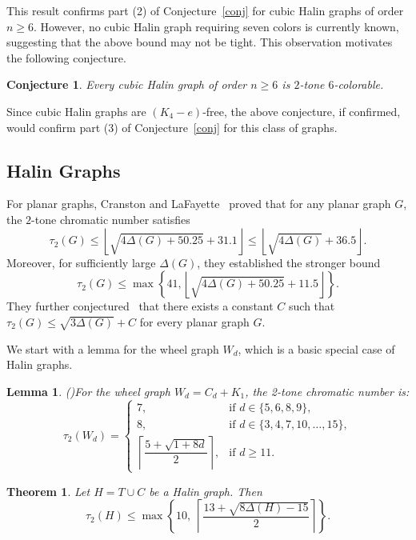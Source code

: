 \documentclass[12pt]{article}
\newtheorem{theorem}{Theorem}
\numberwithin{theorem}{section}
\newtheorem{conjecture}{Conjecture}
\numberwithin{conjecture}{section}
\numberwithin{corollary}{section}
\numberwithin{example}{section}
\newtheorem{lemma}{Lemma}
\numberwithin{lemma}{section}
\numberwithin{proposition}{section}
\numberwithin{problem}{section}
\numberwithin{remark}{section}
\numberwithin{claim}{theorem}
\numberwithin{definition}{section}
\begin{document}
\noindent This result confirms part (2) of Conjecture~\ref{conj} for cubic Halin graphs of order $n \ge 6$. However, no cubic Halin graph requiring seven colors is currently known, suggesting that the above bound may not be tight. This observation motivates the following conjecture.

\begin{conjecture}\label{c}
Every cubic Halin graph of order $n\ge 6$ is $2$-tone $6$-colorable.
\end{conjecture}

\noindent Since cubic Halin graphs are $(K_4-e)$-free, the above conjecture, if confirmed, would confirm part (3) of Conjecture~\ref{conj} for this class of graphs.

\subsection{Halin Graphs}

\noindent For planar graphs, Cranston and LaFayette~\cite{C2} proved that for any planar graph $G$, the $2$-tone chromatic number satisfies
\[
\tau_2(G) \le 
\left\lfloor \sqrt{4\Delta(G)+50.25}+31.1 \right\rfloor
\le
\left\lfloor \sqrt{4\Delta(G)}+36.5 \right\rfloor .
\]
Moreover, for sufficiently large $\Delta(G)$, they established the stronger bound
\[
\tau_2(G)\le 
\max\left\{41,\left\lfloor \sqrt{4\Delta(G)+50.25}+11.5 \right\rfloor \right\}.
\]
They further conjectured~\cite{C2} that there exists a constant $C$ such that $\tau_2(G) \le \sqrt{3\Delta(G)} + C$ for every planar graph $G$. 

\noindent We start with a lemma for the wheel graph $W_d$, which is a basic special case of Halin graphs. 

\begin{lemma}(\cite{B1})\label{l5}
For the wheel graph $W_d = C_d + K_1$, the 2-tone chromatic number is:
\[
\tau_2(W_d)=
\begin{cases}
7, & \text{if } d \in \{5, 6, 8, 9\},\\[2mm]
8, & \text{if } d \in \{3, 4, 7, 10, \dots, 15\},\\[2mm]
\left\lceil \dfrac{5+\sqrt{1+8d}}{2} \right\rceil, & \text{if } d \ge 11.
\end{cases}
\]
\end{lemma}

\begin{theorem}\label{t2'}
Let $H = T \cup C$ be a Halin graph. Then
\[
\tau_2(H)\le 
\max\left\{
10,\;
\left\lceil \frac{13+\sqrt{8\Delta(H)-15}}{2} \right\rceil
\right\}.
\]
\end{theorem}
\end{document}
